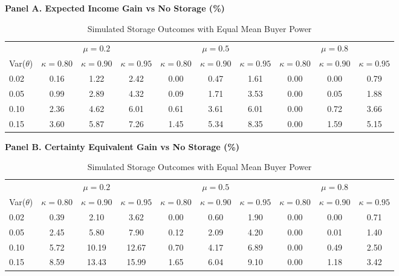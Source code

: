 
\begin{table}[ht!]\centering
\caption{Simulated Storage Outcomes with Equal Mean Buyer Power}
\label{tab:mu_cases_storage_outcomes}
\begin{threeparttable}
\vspace{0.35em}
\noindent\textbf{Panel A. Expected Income Gain vs No Storage (\%)}
\vspace{0.25em}
\begin{tabular}{l|ccc|ccc|ccc}
\toprule
 & \multicolumn{3}{c|}{$\mu=0.2$} & \multicolumn{3}{c|}{$\mu=0.5$} & \multicolumn{3}{c}{$\mu=0.8$} \\
Var($\theta$) & $\kappa=0.80$ & $\kappa=0.90$ & $\kappa=0.95$ & $\kappa=0.80$ & $\kappa=0.90$ & $\kappa=0.95$ & $\kappa=0.80$ & $\kappa=0.90$ & $\kappa=0.95$ \\
\midrule
0.02 & 0.16 & 1.22 & 2.42 & 0.00 & 0.47 & 1.61 & 0.00 & 0.00 & 0.79 \\
0.05 & 0.99 & 2.89 & 4.32 & 0.09 & 1.71 & 3.53 & 0.00 & 0.05 & 1.88 \\
0.10 & 2.36 & 4.62 & 6.01 & 0.61 & 3.61 & 6.01 & 0.00 & 0.72 & 3.66 \\
0.15 & 3.60 & 5.87 & 7.26 & 1.45 & 5.34 & 8.35 & 0.00 & 1.59 & 5.15 \\
\bottomrule
\end{tabular}

\vspace{0.35em}
\noindent\textbf{Panel B. Certainty Equivalent Gain vs No Storage (\%)}
\vspace{0.25em}
\begin{tabular}{l|ccc|ccc|ccc}
\toprule
 & \multicolumn{3}{c|}{$\mu=0.2$} & \multicolumn{3}{c|}{$\mu=0.5$} & \multicolumn{3}{c}{$\mu=0.8$} \\
Var($\theta$) & $\kappa=0.80$ & $\kappa=0.90$ & $\kappa=0.95$ & $\kappa=0.80$ & $\kappa=0.90$ & $\kappa=0.95$ & $\kappa=0.80$ & $\kappa=0.90$ & $\kappa=0.95$ \\
\midrule
0.02 & 0.39 & 2.10 & 3.62 & 0.00 & 0.60 & 1.90 & 0.00 & 0.00 & 0.71 \\
0.05 & 2.45 & 5.80 & 7.90 & 0.12 & 2.09 & 4.20 & 0.00 & 0.01 & 1.40 \\
0.10 & 5.72 & 10.19 & 12.67 & 0.70 & 4.17 & 6.89 & 0.00 & 0.49 & 2.50 \\
0.15 & 8.59 & 13.43 & 15.99 & 1.65 & 6.04 & 9.10 & 0.00 & 1.18 & 3.42 \\
\bottomrule
\end{tabular}


\end{threeparttable}
\end{table}
